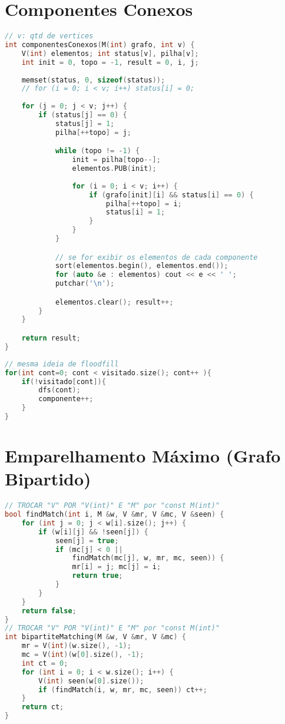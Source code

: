 \newpage

\section{Componentes Conexos}
\begin{lstlisting}[language=C++, title={Versão 1}]
// v: qtd de vertices
int componentesConexos(M(int) grafo, int v) {
	V(int) elementos; int status[v], pilha[v];
    int init = 0, topo = -1, result = 0, i, j;
    
    memset(status, 0, sizeof(status));
	// for (i = 0; i < v; i++) status[i] = 0;
	
    for (j = 0; j < v; j++)	{
		if (status[j] == 0) {
			status[j] = 1;
			pilha[++topo] = j;

			while (topo != -1) {
				init = pilha[topo--];
				elementos.PUB(init);
				
				for (i = 0; i < v; i++)	{
					if (grafo[init][i] && status[i] == 0) {
						pilha[++topo] = i;
						status[i] = 1;
					}
				}
			}

			// se for exibir os elementos de cada componente
			sort(elementos.begin(), elementos.end());
            for (auto &e : elementos) cout << e << ' ';
			putchar('\n');

			elementos.clear(); result++;
		}
	}

	return result;
}
\end{lstlisting}

\begin{lstlisting}[language=C++, title={v2}]
// mesma ideia de floodfill
for(int cont=0; cont < visitado.size(); cont++ ){
	if(!visitado[cont]){
		dfs(cont);
		componente++;
	}
}
\end{lstlisting}

\newpage

\section{Emparelhamento Máximo (Grafo Bipartido)}
\begin{lstlisting}[language=C++]
// TROCAR "V" POR "V(int)" E "M" por "const M(int)"
bool findMatch(int i, M &w, V &mr, V &mc, V &seen) {
    for (int j = 0; j < w[i].size(); j++) {
    	if (w[i][j] && !seen[j]) {
    		seen[j] = true;
            if (mc[j] < 0 || 
            	findMatch(mc[j], w, mr, mc, seen)) {
                mr[i] = j; mc[j] = i;
                return true;
            }
    	}
    }
    return false;
}
// TROCAR "V" POR "V(int)" E "M" por "const M(int)"
int bipartiteMatching(M &w, V &mr, V &mc) {
    mr = V(int)(w.size(), -1);
    mc = V(int)(w[0].size(), -1);
    int ct = 0;
    for (int i = 0; i < w.size(); i++) {
    	V(int) seen(w[0].size());
    	if (findMatch(i, w, mr, mc, seen)) ct++;
    }
    return ct;
}
\end{lstlisting}